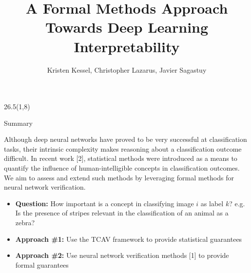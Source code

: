 \documentclass[final]{beamer}
\title{A Formal Methods Approach Towards Deep Learning Interpretability}
\author{Kristen Kessel, Christopher Lazarus, Javier Sagastuy}
\institute{Stanford University}
\begin{document}
\newcommand{\vltbl}{{\color{tbllinecolor}\vrule}}


\begin{frame}[fragile]{}

%

\newcommand{\vstart}{58} %
\newcommand{\vstartCols}{8} %
\newcommand{\fullwidth}{81}  %
\newcommand{\colwidth}{26.5}

\newcommand{\firstcolpos}{1}
\newcommand{\secondcolpos}{28.75}
\newcommand{\thirdcolpos}{56.5}
\newcommand{\bottomblockstart}{108.5}


\newenvironment{paddedBlock}[2][0.95\linewidth]
    {\begin{block}{#2}\begin{minipage}{#1}}
    {\end{minipage}\end{block}}


\begin{textblock}{\colwidth}(\firstcolpos,\vstartCols)

\begin{paddedBlock}{Summary}
Although deep neural networks have proved to be very successful at classification tasks, their intrinsic complexity makes reasoning about a classification outcome difficult.
In recent work [2], statistical methods were introduced as a means to quantify the influence of human-intelligible concepts in classification outcomes.
We aim to assess and extend such methods by leveraging formal methods for neural network verification.
\begin{itemize}
\item \textbf{Question:} How important is a concept in classifying image $i$ as label $k$? e.g. Is the presence of stripes relevant in the classification of an animal as a zebra?
\item \textbf{Approach \#1:} Use the TCAV framework to provide statistical guarantees
\item \textbf{Approach \#2:} Use neural network verification methods [1] to provide formal guarantees
\end{itemize}
\end{paddedBlock}


\end{textblock}
\end{frame}
\end{document}
